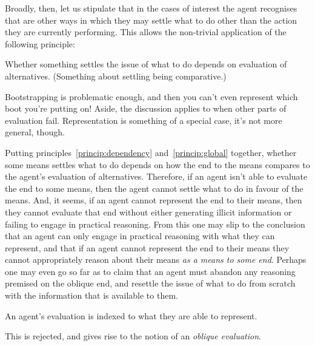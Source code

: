 \documentclass[10pt]{article}
\begin{document}
Broadly, then, let us stipulate that in the cases of interest the agent recognises that are other ways in which they may settle what to do other than the action they are currently performing.
This allows the non-trivial application of the following principle:
\begin{principle}\label{princip:global}
  Whether something settles the issue of what to do depends on evaluation of alternatives.
  (Something about settling being comparative.)
\end{principle}

Bootstrapping is problematic enough, and then you can't even represent which boot you're putting on!
{\color{red} Aside, the discussion applies to when other parts of evaluation fail.
Representation is something of a special case, it's not more general, though.}

Putting principles~\ref{princip:dependency} and~\ref{princip:global} together, whether some means settles what to do depends on how the end to the means compares to the agent's evaluation of alternatives.
Therefore, if an agent isn't able to evaluate the end to some means, then the agent cannot settle what to do in favour of the means.
And, it seems, if an agent cannot represent the end to their means, then they cannot evaluate that end without either generating illicit information or failing to engage in practical reasoning.
From this one may slip to the conclusion that an agent can only engage in practical reasoning with what they can represent, and that if an agent cannot represent the end to their means they cannot appropriately reason about their means \emph{as a means to some end}.
Perhaps one may even go so far as to claim that an agent must abandon any reasoning premised on the oblique end, and resettle the issue of what to do from scratch with the information that is available to them.

\begin{principle}\label{princip:rep-index}
  An agent's evaluation is indexed to what they are able to represent.
\end{principle}



This is rejected, and gives rise to the notion of an \emph{oblique evaluation}.
\end{document}
